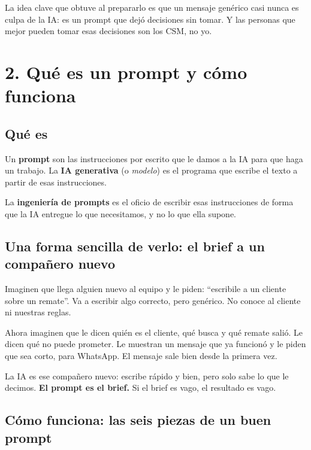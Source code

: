 \documentclass[11pt,letterpaper]{article}
\begin{document}
La idea clave que obtuve al prepararlo es que un mensaje genérico casi nunca
es culpa de la IA: es un prompt que dejó decisiones sin tomar. Y las
personas que mejor pueden tomar esas decisiones son los CSM, no yo.

\section*{2. Qué es un prompt y cómo funciona}

\subsection*{Qué es}

Un \textbf{prompt} son las instrucciones por escrito que le damos a la IA
para que haga un trabajo. La \textbf{IA generativa} (o \emph{modelo}) es el
programa que escribe el texto a partir de esas instrucciones.

La \textbf{ingeniería de prompts} es el oficio de escribir esas
instrucciones de forma que la IA entregue lo que necesitamos, y no lo que
ella supone.

\subsection*{Una forma sencilla de verlo: el brief a un compañero nuevo}

Imaginen que llega alguien nuevo al equipo y le piden: \enquote{escribile a
un cliente sobre un remate}. Va a escribir algo correcto, pero genérico.
No conoce al cliente ni nuestras reglas.

Ahora imaginen que le dicen quién es el cliente, qué busca y qué remate
salió. Le dicen qué no puede prometer. Le muestran un mensaje que ya
funcionó y le piden que sea corto, para WhatsApp. El mensaje sale bien
desde la primera vez.

La IA es ese compañero nuevo: escribe rápido y bien, pero solo sabe lo que
le decimos. \textbf{El prompt es el brief.} Si el brief es vago, el
resultado es vago.

\subsection*{Cómo funciona: las seis piezas de un buen prompt}
\end{document}
